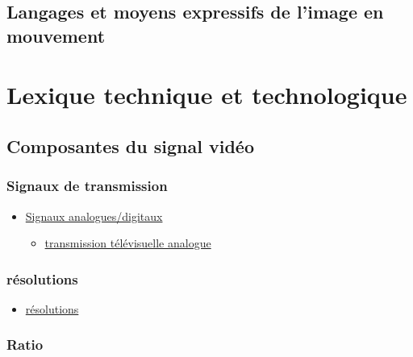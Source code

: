 \documentclass[
]{book}
\providecommand{\tightlist}{%
  \setlength{\itemsep}{0pt}\setlength{\parskip}{0pt}}
\begin{document}
\hypertarget{evolution_historique_language}{%
\section{Langages et moyens expressifs de l'image en mouvement}\label{evolution_historique_language}}

\hypertarget{lexique}{%
\chapter{Lexique technique et technologique}\label{lexique}}

\hypertarget{lexique_composantes}{%
\section{Composantes du signal vidéo}\label{lexique_composantes}}

\hypertarget{signaux-de-transmission}{%
\subsection{Signaux de transmission}\label{signaux-de-transmission}}

\begin{itemize}
\tightlist
\item
  \href{https://en.wikipedia.org/wiki/Video\#Analog_video}{Signaux analogues/digitaux}

  \begin{itemize}
  \tightlist
  \item
    \href{https://en.wikipedia.org/wiki/Analog_television}{transmission télévisuelle analogue}
  \end{itemize}
\end{itemize}

\hypertarget{ruxe9solutions}{%
\subsection{résolutions}\label{ruxe9solutions}}

\begin{itemize}
\tightlist
\item
  \href{https://en.wikipedia.org/wiki/Computer_display_standard\#/media/File:Vector_Video_Standards2.svg}{résolutions}
\end{itemize}

\hypertarget{ratio}{%
\subsection{Ratio}\label{ratio}}
\end{document}

